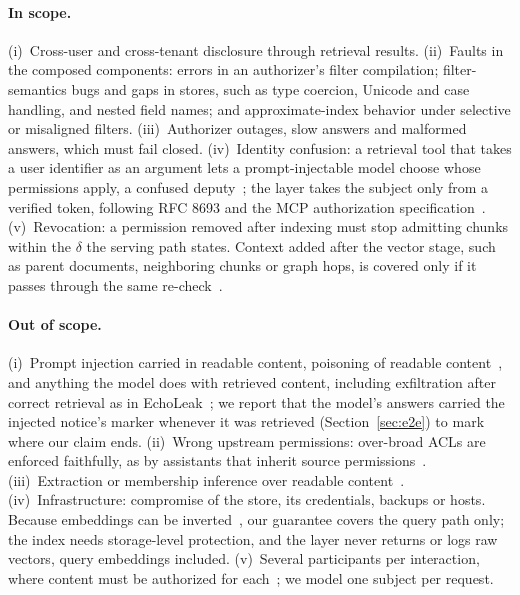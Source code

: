 \paragraph{In scope.}
(i)~Cross-user and cross-tenant disclosure through retrieval results. (ii)~Faults in the composed
components: errors in an authorizer's filter compilation; filter-semantics bugs and gaps in stores,
such as type coercion, Unicode and case handling, and nested field names; and approximate-index
behavior under selective or misaligned filters. (iii)~Authorizer outages, slow answers and malformed
answers, which must fail closed. (iv)~Identity confusion: a retrieval tool that takes a user
identifier as an argument lets a prompt-injectable model choose whose permissions apply, a confused
deputy~\cite{hardy1988confused}; the layer takes the subject only from a verified token, following
RFC 8693 and the MCP authorization specification~\cite{jones2020oauth,mcp2026model}.
(v)~Revocation: a permission removed after indexing must stop admitting chunks within the $\delta$ the
serving path states. Context added after the vector stage, such as parent documents, neighboring
chunks or graph hops, is covered only if it passes through the same re-check~\cite{thornton2026retrieval}.

\paragraph{Out of scope.}
(i)~Prompt injection carried in readable content, poisoning of readable content~\cite{zou2025poisonedrag},
and anything the model does with retrieved content, including exfiltration after correct retrieval
as in EchoLeak~\cite{nvd2025cve202532711}; we report that the model's answers carried the injected notice's marker whenever it was
retrieved (Section~\ref{sec:e2e}) to mark where our claim ends. (ii)~Wrong upstream permissions:
over-broad ACLs are enforced faithfully, as by assistants that inherit source
permissions~\cite{microsoft2026data}. (iii)~Extraction or membership inference over readable
content~\cite{zeng2024good,naseh2025riddle}. (iv)~Infrastructure: compromise of the store, its
credentials, backups or hosts. Because embeddings can be inverted~\cite{morris2023text,zhang2025universal},
our guarantee covers the query path only; the index needs storage-level protection, and the layer
never returns or logs raw vectors, query embeddings included. (v)~Several participants per
interaction, where content must be authorized for each~\cite{bhatt2025enterprise}; we model one
subject per request.

